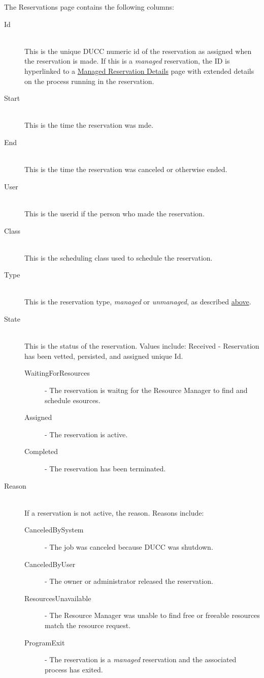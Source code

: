 The Reservations page contains the following columns: 
\begin{description}

\item[Id] \hfill \\
  This is the unique DUCC numeric id of the reservation as assigned when the reservation is made.
  If this is a {\em managed} reservation, the ID is hyperlinked to a
  \hyperref[sec:ws-managed-reservation-details]{Managed Reservation Details} page with extended
  details on the process running in the reservation.

\item[Start] \hfill \\
  This is the time the reservation was mde.
  
\item[End] \hfill \\
  This is the time the reservation was canceled or otherwise ended.
  
\item[User] \hfill \\
  This is the userid if the person who made the reservation.
  
\item[Class] \hfill \\
  This is the scheduling class used to schedule the reservation.
  
\item[Type] \hfill \\
  This is the reservation type, {\em managed} or {\em unmanaged}, as described 
  \hyperref[sec:ws-reservations]{above}.

\item[State] \hfill \\
  This is the status of the reservation. Values include: Received - Reservation
  has been vetted, persisted, and assigned unique Id.
  \begin{description}
  \item[WaitingForResources] - The reservation is waitng for the Resource Manager to find and 
    schedule esources. 
  \item[Assigned] - The reservation is active. 
  \item[Completed] - The reservation has been terminated.
  \end{description}

\item[Reason] \hfill \\
  If a reservation is not active, the reason. Reasons include:
  \begin{description}
  \item[CanceledBySystem] - The job was canceled because DUCC was shutdown. 
  \item[CanceledByUser] - The owner or administrator released the reservation. 
  \item[ResourcesUnavailable] - The Resource Manager was unable to find free or freeable resources 
    match the resource request. 
  \item[ProgramExit] - The reservation is a {\em managed} reservation and the associated
    process has exited.
  \end{description}


\end{description}
